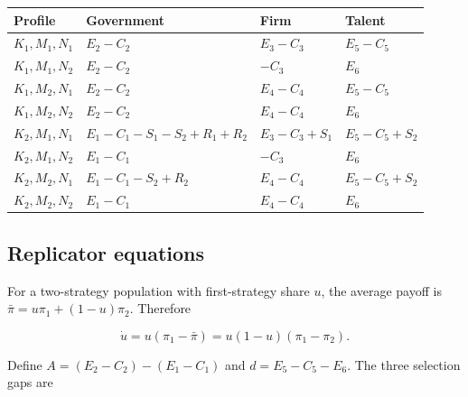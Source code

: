 \documentclass[
  11pt,
  letterpaper,
]{article}
\begin{document}
\begin{longtable}[]{@{}
  >{\raggedright\arraybackslash}p{}
  >{\raggedright\arraybackslash}p{}
  >{\raggedright\arraybackslash}p{}
  >{\raggedright\arraybackslash}p{}@{}}
\toprule\noalign{}
\begin{minipage}[b]{\linewidth}\raggedright
Profile
\end{minipage} & \begin{minipage}[b]{\linewidth}\raggedright
Government
\end{minipage} & \begin{minipage}[b]{\linewidth}\raggedright
Firm
\end{minipage} & \begin{minipage}[b]{\linewidth}\raggedright
Talent
\end{minipage} \\
\midrule\noalign{}
\endhead
\bottomrule\noalign{}
\endlastfoot
\(K_1,M_1,N_1\) & \(E_2-C_2\) & \(E_3-C_3\) & \(E_5-C_5\) \\
\(K_1,M_1,N_2\) & \(E_2-C_2\) & \(-C_3\) & \(E_6\) \\
\(K_1,M_2,N_1\) & \(E_2-C_2\) & \(E_4-C_4\) & \(E_5-C_5\) \\
\(K_1,M_2,N_2\) & \(E_2-C_2\) & \(E_4-C_4\) & \(E_6\) \\
\(K_2,M_1,N_1\) & \(E_1-C_1-S_1-S_2+R_1+R_2\) & \(E_3-C_3+S_1\) &
\(E_5-C_5+S_2\) \\
\(K_2,M_1,N_2\) & \(E_1-C_1\) & \(-C_3\) & \(E_6\) \\
\(K_2,M_2,N_1\) & \(E_1-C_1-S_2+R_2\) & \(E_4-C_4\) & \(E_5-C_5+S_2\) \\
\(K_2,M_2,N_2\) & \(E_1-C_1\) & \(E_4-C_4\) & \(E_6\) \\
\end{longtable}

\subsection{Replicator equations}\label{replicator-equations}

For a two-strategy population with first-strategy share \(u\), the
average payoff is \(\bar\pi=u\pi_1+(1-u)\pi_2\). Therefore

\[\dot u=u(\pi_1-\bar\pi)=u(1-u)(\pi_1-\pi_2).\]

Define \(A=(E_2-C_2)-(E_1-C_1)\) and \(d=E_5-C_5-E_6\). The three
selection gaps are
\end{document}
